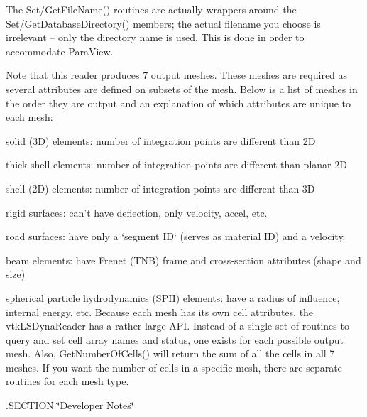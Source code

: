 The Set/\-Get\-File\-Name() routines are actually wrappers around the Set/\-Get\-Database\-Directory() members; the actual filename you choose is irrelevant -- only the directory name is used. This is done in order to accommodate Para\-View.

Note that this reader produces 7 output meshes. These meshes are required as several attributes are defined on subsets of the mesh. Below is a list of meshes in the order they are output and an explanation of which attributes are unique to each mesh\-:
\begin{DoxyItemize}
\item solid (3\-D) elements\-: number of integration points are different than 2\-D
\item thick shell elements\-: number of integration points are different than planar 2\-D
\item shell (2\-D) elements\-: number of integration points are different than 3\-D
\item rigid surfaces\-: can't have deflection, only velocity, accel, etc.
\item road surfaces\-: have only a \char`\"{}segment I\-D\char`\"{} (serves as material I\-D) and a velocity.
\item beam elements\-: have Frenet (T\-N\-B) frame and cross-\/section attributes (shape and size)
\item spherical particle hydrodynamics (S\-P\-H) elements\-: have a radius of influence, internal energy, etc. Because each mesh has its own cell attributes, the vtk\-L\-S\-Dyna\-Reader has a rather large A\-P\-I. Instead of a single set of routines to query and set cell array names and status, one exists for each possible output mesh. Also, Get\-Number\-Of\-Cells() will return the sum of all the cells in all 7 meshes. If you want the number of cells in a specific mesh, there are separate routines for each mesh type.
\end{DoxyItemize}

.S\-E\-C\-T\-I\-O\-N \char`\"{}\-Developer Notes\char`\"{}

